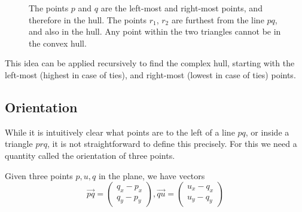 \begin{figure}[ht]
{
    }
    \caption{The points $p$ and $q$ are the left-most and 
             right-most points, and therefore in the hull. The points $r_1$,
             $r_2$ are furthest from the line $pq$, and also in the hull. Any
             point within the two triangles cannot be in the convex hull.}
    \label{fig:quickhull}
\end{figure}

This idea can be applied recursively to find the complex hull, starting with
the left-most (highest in case of ties), and right-most (lowest in case of ties)
points.

\subsection{Orientation}

While it is intuitively clear what points are to the left of a line $pq$, or
inside a triangle $prq$, it is not straightforward to define this precisely.
For this we need a quantity called the orientation of three points.

Given three points $p, u, q$ in the plane, we have vectors
\[
    \vec{pq} = \begin{pmatrix}
        q_x - p_x \\
        q_y - p_y
    \end{pmatrix},
    \vec{qu} = \begin{pmatrix}
        u_x - q_x \\
        u_y - q_y
    \end{pmatrix}
\]

